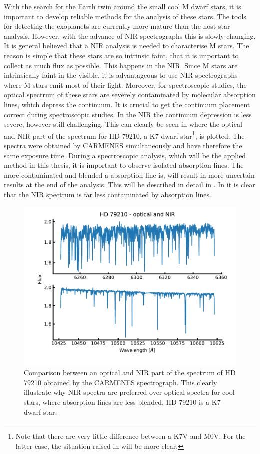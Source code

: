 With the search for the Earth twin around the small cool M dwarf stars, it is important to develop
reliable methods for the analysis of these stars. The tools for detecting the exoplanets are
currently more mature than the host star analysis. However, with the advance of NIR spectrographs
this is slowly changing. It is general believed that a NIR analysis is needed to characterise M
stars. The reason is simple that these stars are so intrinsic faint, that it is important to collect
as much flux as possible. This happens in the NIR. Since M stars are intrinsically faint in the
visible, it is advantageous to use NIR spectrographs where M stars emit most of their light.
Moreover, for spectroscopic studies, the optical spectrum of these stars are severely contaminated
by molecular absorption lines, which depress the continuum. It is crucial to get the continuum
placement correct during spectroscopic studies. In the NIR the continuum depression is less severe,
however still challenging. This can clearly be seen in  where the optical and
NIR part of the spectrum for HD 79210, a K7 dwarf star\footnote{Note that there are very little
difference between a K7V and M0V. For the latter case, the situation raised in
 will be more clear.}, is plotted. The spectra were obtained by CARMENES
simultaneously and have therefore the same exposure time. During a spectroscopic analysis, which
will be the applied method in this thesis, it is important to observe isolated absorption lines. The
more contaminated and blended a absorption line is, will result in more uncertain results at the end
of the analysis. This will be described in detail in . In
 it is clear that the NIR spectrum is far less contaminated by absorption
lines.

\begin{figure}[htpb!]
    \centering
    \includegraphics[width=1.0\linewidth]{figures/opticalVSnir.pdf}
    \caption{Comparison between an optical and NIR part of the spectrum of HD 79210 obtained by
             the CARMENES spectrograph. This clearly illustrate why NIR spectra are preferred over
             optical spectra for cool stars, where absorption lines are less blended. HD 79210 is a
             K7 dwarf star.}
    \label{fig:opticalVSnir}
\end{figure}

